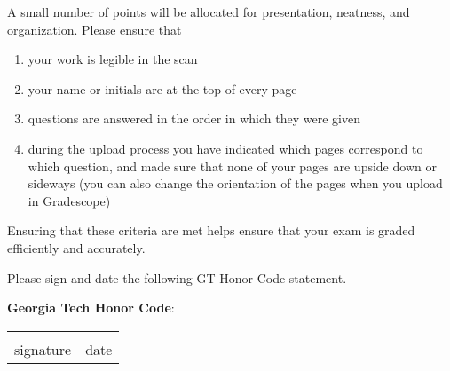 \documentclass[12pt]{exam}
\begin{document}
\begin{questions}
            
    
\newpage \Initials
    

    \question[2] A small number of points will be allocated for presentation, neatness, and organization. Please ensure that
    \begin{enumerate}
        \item your work is legible in the scan
        \item your name or initials are at the top of every page
        \item questions are answered in the order in which they were given
        \item during the upload process you have indicated which pages correspond to which question, and made sure that none of your pages are upside down or sideways (you can also change the orientation of the pages when you upload in Gradescope)
    \end{enumerate}
    Ensuring that these criteria are met helps ensure that your exam is graded efficiently and accurately. 
    


    
\end{questions}
    
    Please sign and date the following GT Honor Code statement. \\ 
    \vspace{2pt}
    
    \textbf{Georgia Tech Honor Code}:\ \GTHonorCode
    
    \begin{center}
    \begin{center}
        \def\arraystretch{0.35}%
        \begin{tabular}{ b{8cm} b{8cm} }
        \vspace{.5cm} \underline{\hspace{7cm}} & \vspace{.5cm} \underline{\hspace{4.5cm}}  \tabularnewline
        \vspace{6pt} signature & \vspace{6pt} date    
        \end{tabular}
    \end{center}
    \end{center}    
\end{document}
